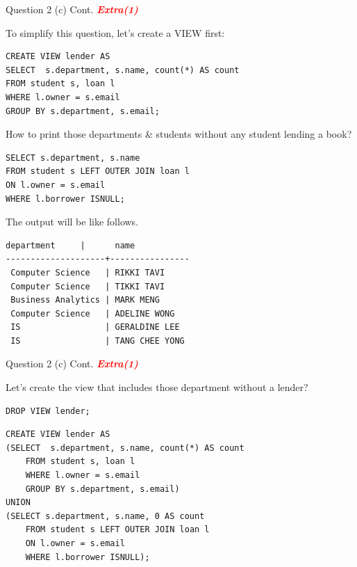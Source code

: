 \begin{frame}[fragile]{Question 2 (c) Cont. \textcolor{red}{\textit{\textbf{Extra(1)}}}}
	
To simplify this question, let's create a VIEW first:
\begin{lstlisting}[style=sql-small]
CREATE VIEW lender AS
SELECT  s.department, s.name, count(*) AS count
FROM student s, loan l
WHERE l.owner = s.email
GROUP BY s.department, s.email;
\end{lstlisting}\vspace{3pt}

How to print those departments \& students without any student lending a book?
\begin{lstlisting}[style=sql-small]
SELECT s.department, s.name
FROM student s LEFT OUTER JOIN loan l 
ON l.owner = s.email
WHERE l.borrower ISNULL;
\end{lstlisting}\vspace{3pt}

The output will be like follows.
\begin{lstlisting}[style=terminal-tiny]
     department     |      name      
--------------------+----------------
 Computer Science   | RIKKI TAVI
 Computer Science   | TIKKI TAVI
 Business Analytics | MARK MENG
 Computer Science   | ADELINE WONG
 IS                 | GERALDINE LEE
 IS                 | TANG CHEE YONG
\end{lstlisting}

\end{frame}

\begin{frame}[fragile]{Question 2 (c) Cont. \textcolor{red}{\textit{\textbf{Extra(1)}}}}

Let's create the view that includes those department without a lender?
\begin{lstlisting}
DROP VIEW lender;
\end{lstlisting}
\begin{lstlisting}
CREATE VIEW lender AS
(SELECT  s.department, s.name, count(*) AS count
	FROM student s, loan l
	WHERE l.owner = s.email
	GROUP BY s.department, s.email)
UNION
(SELECT s.department, s.name, 0 AS count
	FROM student s LEFT OUTER JOIN loan l 
	ON l.owner = s.email
	WHERE l.borrower ISNULL);
\end{lstlisting}

\end{frame}

